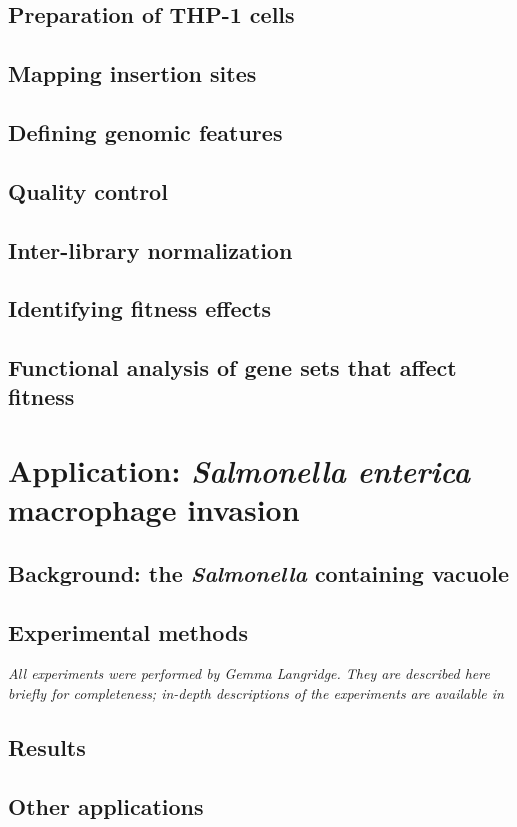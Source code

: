 \subsection{Preparation of THP-1 cells}

\subsection{Mapping insertion sites}

\subsection{Defining genomic features}

\subsection{Quality control}

\subsection{Inter-library normalization}

\subsection{Identifying fitness effects}

\subsection{Functional analysis of gene sets that affect fitness}

\section{Application: \textit{Salmonella enterica} macrophage invasion}

\subsection{Background: the {\it Salmonella} containing vacuole}

\subsection{Experimental methods}

\textit{All experiments were performed by Gemma Langridge. They are described here briefly for completeness; in-depth descriptions of the experiments are available in \parencite{Langridge2010}}


\subsection{Results}

\subsection{Other applications}